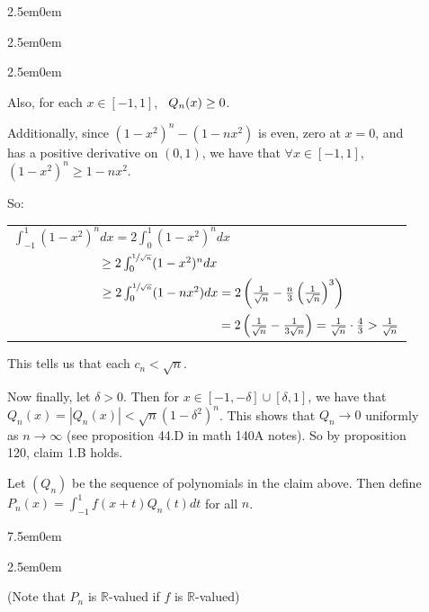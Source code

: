 \documentclass{book}
\newenvironment{myIndent}{%
   \begin{adjustwidth}{2.5em}{0em}%
}{%
   \end{adjustwidth}%
}
\newenvironment{myTindent}{%
   \begin{adjustwidth}{7.5em}{0em}%
}{%
   \end{adjustwidth}%
}
\newcommand{\myHS}{ \hspace{0.5em}}
\newcommand{\retTwo}{\hfill\bigbreak}
\begin{document}
{\begin{myIndent}
{\begin{myIndent}
{\begin{myIndent}
         Also, for each $x \in [-1, 1]$, $\myHS Q_n(x) \geq 0$.\retTwo
         
         Additionally, since $(1 - x^2)^n - (1-nx^2)$ is even, zero at $x = 0$, and\\ has a positive derivative on $(0, 1)$, we have that $\forall x \in [-1, 1]$,\\ $(1-x^2)^n \geq 1 - nx^2$.

         \newpage

         So:
         \begin{center}
            \begin{tabular}{l}
               $\int_{-1}^1 (1-x^2)^ndx = 2\int_{0}^1 (1-x^2)^ndx$\\ [3pt]
               $\phantom{\int_{-1}^1 (1-x^2)^ndx} \geq 2\int_{0}^{\sfrac{1}{\sqrt{n}}}(1-x^2)^ndx$\\ [-2pt]
               $\phantom{\int_{-1}^1 (1-x^2)^ndx} \geq 2\int_0^{\sfrac{1}{\sqrt{n}}}(1-nx^2)dx = 2\left(\frac{1}{\sqrt{n}} - \frac{n}{3}\left(\frac{1}{\sqrt{n}}\right)^3\right)$\\ [8pt]
               $\phantom{\int_{-1}^1 (1-x^2)^ndx \geq 2\int_0^{\sfrac{1}{\sqrt{n}}}(1-nx^2)dx} = 2\left(\frac{1}{\sqrt{n}} - \frac{1}{3\sqrt{n}}\right) = \frac{1}{\sqrt{n}}\cdot \frac{4}{3} > \frac{1}{\sqrt{n}}$
            \end{tabular}\retTwo
         \end{center}

         This tells us that each $c_n < \sqrt{n}$.\retTwo

         Now finally, let $\delta > 0$. Then for $x \in [-1, -\delta] \cup [\delta, 1]$, we have that\\ $Q_n(x) = |Q_n(x)| < \sqrt{n}(1-\delta^2)^n$. This shows that $Q_n \rightarrow 0$ uniformly\\ as $n \rightarrow \infty$ (see proposition 44.D in math 140A notes). So by proposition\\ 120, claim 1.B holds.\retTwo
      \end{myIndent}}

      Let $(Q_n)$ be the sequence of polynomials in the claim above. Then define\\ $P_n(x) = \int_{-1}^{1}f(x+t)Q_n(t)dt$ for all $n$.
      
      \begin{myTindent}\begin{myIndent}
         (Note that $P_n$ is $\mathbb{R}$-valued if $f$ is $\mathbb{R}$-valued)\retTwo
      \end{myIndent}\end{myTindent}


\end{myIndent}}
\end{myIndent}}
\end{document}
